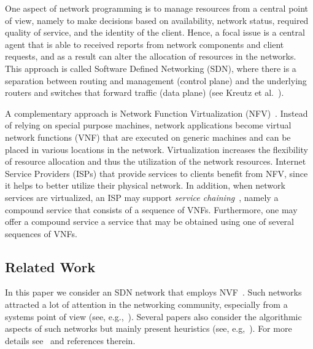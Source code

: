 \documentclass[runningheads]{llncs}
\begin{document}
One aspect of network programming is to manage resources from a
central point of view, namely to make decisions based on availability,
network status, required quality of service, and the identity of the
client.  Hence, a focal issue is a central agent that is able to
received reports from network components and client requests, and as a
result can alter the allocation of resources in the networks.  This
approach is called Software Defined Networking (SDN), where there is a
separation between routing and management (control plane) and the
underlying routers and switches that forward traffic (data plane) (see
Kreutz et al.~\cite{KRVRAU15}).

A complementary approach is Network Function Virtualization
(NFV)~\cite{NFV12}.  Instead of relying on special purpose machines,
network applications become virtual network functions (VNF) that are
executed on generic machines and can be placed in various locations in
the network.  Virtualization increases the flexibility of resource
allocation and thus the utilization of the network resources.
%
Internet Service Providers (ISPs) that provide services to clients
benefit from NFV, since it helps to better utilize their physical
network.  In addition, when network services are virtualized, an ISP
may support \emph{service chaining}~\cite{ServiceChaining15}, namely a
compound service that consists of a sequence of VNFs.  Furthermore,
one may offer a compound service a service that may be obtained using
one of several sequences of VNFs.


\subsection{Related Work}

In this paper we consider an SDN network that employs
NVF~\cite{SDN-NFV15}.  Such networks attracted a lot of attention in
the networking community, especially from a systems point of view
(see, e.g.,~\cite{GVPGKDA14,HVSBFTF15}).  Several papers also consider
the algorithmic aspects of such networks but mainly present heuristics
(see, e.g,~\cite{SBMPKSF14}).  For more details see~\cite{ERS16} and
references therein.
\end{document}
